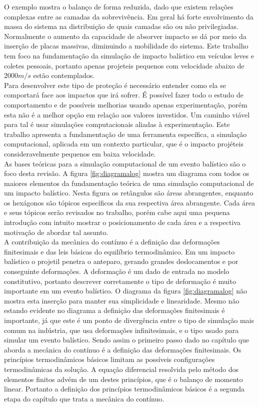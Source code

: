 O exemplo mostra o balanço de forma reduzida, dado que existem relações complexas entre as camadas da sobrevivência. Em geral há forte envolvimento da massa do sistema na distribuição de quais camadas são ou não privilegiadas. Normalmente o aumento da capacidade de absorver impacto se dá por meio da inserção de placas massivas, diminuindo a mobilidade do sistema. Este trabalho tem foco na fundamentação da simulação de impacto balístico em veículos leves e coletes pessoais, portanto apenas projeteis pequenos com velocidade abaixo de $ 2000 m/s$ estão contemplados. \\

Para desenvolver este tipo de proteção é necessário entender como ela se comportará face aos impactos que irá sofrer. É possível fazer todo o estudo de comportamento e de possíveis melhorias usando apenas experimentação, porém esta não é a melhor opção em relação aos valores investidos. Um caminho viável para tal é usar simulações computacionais aliadas à experimentação. Este trabalho apresenta a fundamentação de uma ferramenta específica, a simulação computacional, aplicada em um contexto particular, que é o impacto projéteis consideravelmente pequenos em baixa velocidade. \\

As bases teóricas para a simulação computacional de um evento balístico são o foco desta revisão. A figura \ref{fig:diagramalog} mostra um diagrama com todos os maiores elementos da fundamentação teórica de uma simulação computacional de um impacto balístico. Nesta figura os retângulos são áreas abrangentes, enquanto os hexágonos são tópicos específicos da sua respectiva área abrangente. Cada área e seus tópicos serão revisados no trabalho, porém cabe aqui uma pequena introdução com intuito mostrar o posicionamento de cada área e a respectiva motivação de abordar tal assunto. \\

A contribuição da mecânica do contínuo é a definição das deformações finitesimais e das leis básicas do equilíbrio termodinâmico. Em um impacto balístico o projetil penetra o anteparo, gerando grandes deslocamentos e por conseguinte deformações. A deformação é um dado de entrada no modelo constitutivo, portanto descrever corretamente o tipo de deformação é muito importante em um evento balístico. O diagrama da figura \ref{fig:diagramalog} não mostra esta inserção para manter sua simplicidade e linearidade. Mesmo não estando evidente no diagrama a definição das deformações finitesimais é importante, já que este é um ponto de divergência entre o tipo de simulação mais comum na indústria, que usa deformações infinitesimais, e o tipo usado para simular um evento balístico. Sendo assim o primeiro passo dado no capítulo que aborda a mecânica do contínuo é a definição das deformações finitesimais. Os princípios termodinâmicos básicos limitam as possíveis configurações termodinâmicas da solução. A equação diferencial resolvida pelo método dos elementos finitos advém de um destes princípios, que é o balanço de momento linear. Portanto a definição dos princípios termodinâmicos básicos é a segunda etapa do capítulo que trata a mecânica do contínuo. \\

